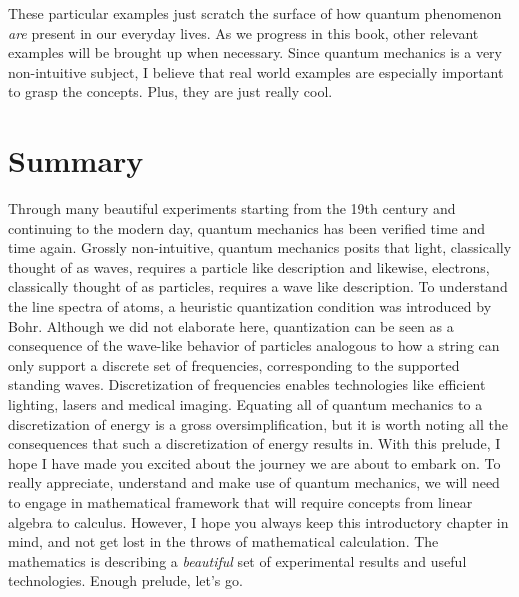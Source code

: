 These particular examples just scratch the surface of how quantum phenomenon \textit{are} present in our everyday lives. As we progress in this book, other relevant examples will be brought up when necessary. Since quantum mechanics is a very non-intuitive subject, I believe that real world examples are especially important to grasp the concepts. Plus, they are just really cool. 

\section{Summary}

Through many beautiful experiments starting from the 19th century and continuing to the modern day, quantum mechanics has been verified time and time again. Grossly non-intuitive, quantum mechanics posits that light, classically thought of as waves, requires a particle like description and likewise, electrons, classically thought of as particles, requires a wave like description. To understand the line spectra of atoms, a heuristic quantization condition was introduced by Bohr. Although we did not elaborate here, quantization can be seen as a consequence of the wave-like behavior of particles analogous to how a string can only support a discrete set of frequencies, corresponding to the supported standing waves. Discretization of frequencies enables technologies like efficient lighting, lasers and medical imaging. Equating all of quantum mechanics to a discretization of energy is a gross oversimplification, but it is worth noting all the consequences that such a discretization of energy results in. With this prelude, I hope I have made you excited about the journey we are about to embark on. To really appreciate, understand and make use of quantum mechanics, we will need to engage in mathematical framework that will require concepts from linear algebra to calculus. However, I hope you always keep this introductory chapter in mind, and not get lost in the throws of mathematical calculation. The mathematics is describing a \textit{beautiful} set of experimental results and useful technologies. Enough prelude, let's go.
